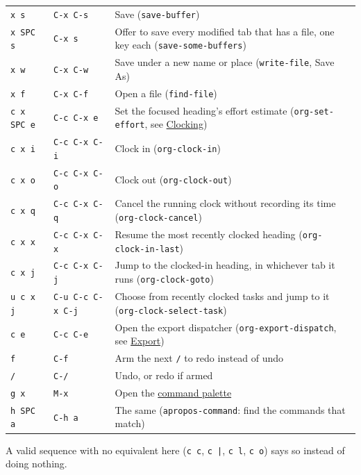 \documentclass[11pt]{article}
\begin{document}
\begin{center}
\begin{tabular}{lll}
\texttt{x s} & \texttt{C-x C-s} & Save (\texttt{save-buffer})\\[0pt]
\texttt{x SPC s} & \texttt{C-x s} & Offer to save every modified tab that has a file, one key each (\texttt{save-some-buffers})\\[0pt]
\texttt{x w} & \texttt{C-x C-w} & Save under a new name or place (\texttt{write-file}, Save As)\\[0pt]
\texttt{x f} & \texttt{C-x C-f} & Open a file (\texttt{find-file})\\[0pt]
\texttt{c x SPC e} & \texttt{C-c C-x e} & Set the focused heading's effort estimate (\texttt{org-set-effort}, see \hyperref[sec:org6e1340d]{Clocking})\\[0pt]
\texttt{c x i} & \texttt{C-c C-x C-i} & Clock in (\texttt{org-clock-in})\\[0pt]
\texttt{c x o} & \texttt{C-c C-x C-o} & Clock out (\texttt{org-clock-out})\\[0pt]
\texttt{c x q} & \texttt{C-c C-x C-q} & Cancel the running clock without recording its time (\texttt{org-clock-cancel})\\[0pt]
\texttt{c x x} & \texttt{C-c C-x C-x} & Resume the most recently clocked heading (\texttt{org-clock-in-last})\\[0pt]
\texttt{c x j} & \texttt{C-c C-x C-j} & Jump to the clocked-in heading, in whichever tab it runs (\texttt{org-clock-goto})\\[0pt]
\texttt{u c x j} & \texttt{C-u C-c C-x C-j} & Choose from recently clocked tasks and jump to it (\texttt{org-clock-select-task})\\[0pt]
\texttt{c e} & \texttt{C-c C-e} & Open the export dispatcher (\texttt{org-export-dispatch}, see \hyperref[sec:org9a53e51]{Export})\\[0pt]
\texttt{f} & \texttt{C-f} & Arm the next \texttt{/} to redo instead of undo\\[0pt]
\texttt{/} & \texttt{C-/} & Undo, or redo if armed\\[0pt]
\texttt{g x} & \texttt{M-x} & Open the \hyperref[sec:org55cb874]{command palette}\\[0pt]
\texttt{h SPC a} & \texttt{C-h a} & The same (\texttt{apropos-command}: find the commands that match)\\[0pt]
\end{tabular}
\end{center}

A valid sequence with no equivalent here (\texttt{c c}, \texttt{c |}, \texttt{c l}, \texttt{c o}) says so instead of doing nothing.
\end{document}
